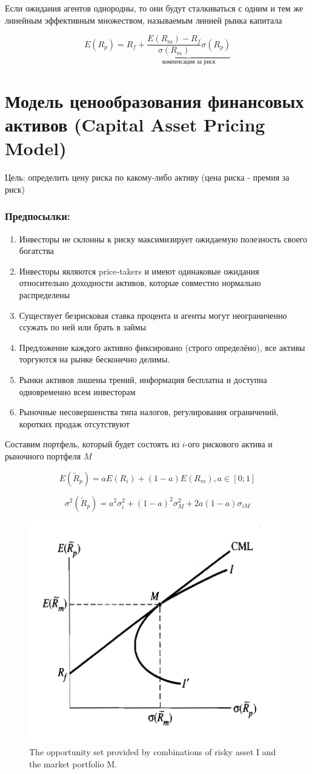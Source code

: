 \documentclass[a4paper,12pt]{article} %
\begin{document}
      
      Если ожидания агентов однородны, то они будут сталкиваться с одним и тем же линейным эффективным множеством, называемым линией рынка капитала
      
      \[ E(R_p) = R_f + \underbrace{\dfrac{E(R_m)-R_f}{\sigma(R_m)}  \sigma (R_p) }_{\text{компенсация за риск}} \]
   
\section{Модель ценообразования финансовых активов (Capital Asset Pricing Model)} 

Цель: определить  цену риска по какому-либо активу (цена риска - премия за риск)

\subsubsection*{ Предпосылки:} 

 \begin{enumerate}
 	\item Инвесторы не склонны к риску максимизирует ожидаемую полезность своего богатства
 	\item  Инвесторы являются  price-takers и имеют одинаковые ожидания относительно доходности активов, которые совместно нормально распределены 
 	\item Существует безрисковая ставка процента и агенты могут неограниченно ссужать по ней или брать в займы
 	\item  Предложение каждого активно фиксировано (строго определёно), все активы торгуются  на рынке бесконечно делимы.  
 	\item Рынки активов лишены трений,  информация бесплатна и доступна одновременно всем инвесторам 
 	\item Рыночные несовершенства типа налогов, регулирования ограничений, коротких продаж отсутствуют 
 \end{enumerate}

Составим портфель,  который будет состоять из $ i $-ого рискового актива и рыночного портфеля $ M $ 

    \[ E(\tilde{R}_p) = aE(R_i) + (1-a)E(R_m), a \in [0;1] \]

\[ \sigma^2(\tilde{R}_p) = a^2 \sigma^2_{i} + (1-a)^2 \sigma^2_{M}  + 2a(1-a) \sigma_{iM}  \]

\begin{figure}[h!]
	\centering
	\includegraphics[width=0.5\linewidth]{screenshot015}
	\caption{The opportunity set provided by combinations of risky asset I and the market portfolio M.}
	\label{fig:screenshot015}
\end{figure}
\end{document}
